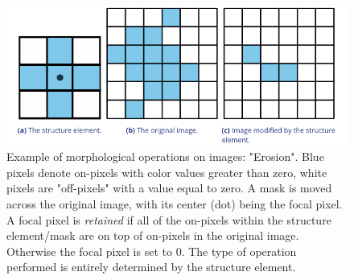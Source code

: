 \documentclass[9pt,lineno]{elife}
\begin{document}
\begin{figure}[t]
    \centering
    \includegraphics[width=\textwidth]{figures/fig_structure_elements.pdf}
    \caption{Example of morphological operations on images: "Erosion". Blue pixels denote on-pixels with color values greater than zero, white pixels are "off-pixels" with a value equal to zero. A mask is moved across the original image, with its center (dot) being the focal pixel. A focal pixel is \textit{retained} if all of the on-pixels within the structure element/mask are on top of on-pixels in the original image. Otherwise the focal pixel is set to 0. The type of operation performed is entirely determined by the structure element.}
	\label{fig:erosion}
\end{figure}
\end{document}
